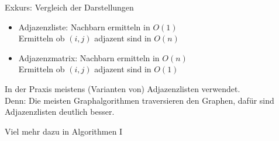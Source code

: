 \begin{frame}{Exkurs: Vergleich der Darstellungen}
	\begin{itemize}[<+->]
		\item Adjazenzliste: Nachbarn ermitteln in $O(1)$\\
		Ermitteln ob $(i,j)$ adjazent sind in $O(n)$
		\item Adjazenzmatrix: Nachbarn ermitteln in $O(n)$\\
		Ermitteln ob $(i,j)$ adjazent sind in $O(1)$
	\end{itemize}

	\pause
	In der Praxis meistens (Varianten von) Adjazenzlisten verwendet.\\
	Denn: Die meisten Graphalgorithmen traversieren den Graphen, dafür sind Adjazenzlisten deutlich besser.
	
	\bigskip
	Viel mehr dazu in Algorithmen I
\end{frame}
